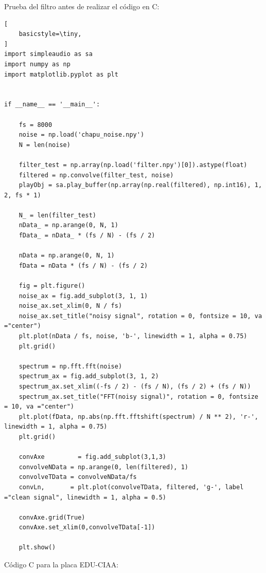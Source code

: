 \documentclass[
    11pt,
    spanish,
	a4paper
]{article}
\begin{document}
Prueba del filtro antes de realizar el código en C:


\begin{lstlisting}[
    basicstyle=\tiny,
]
import simpleaudio as sa
import numpy as np
import matplotlib.pyplot as plt


if __name__ == '__main__':

    fs = 8000
    noise = np.load('chapu_noise.npy')
    N = len(noise)

    filter_test = np.array(np.load('filter.npy')[0]).astype(float)
    filtered = np.convolve(filter_test, noise)
    playObj = sa.play_buffer(np.array(np.real(filtered), np.int16), 1, 2, fs * 1)

    N_ = len(filter_test)
    nData_ = np.arange(0, N, 1)
    fData_ = nData_ * (fs / N) - (fs / 2)

    nData = np.arange(0, N, 1)
    fData = nData * (fs / N) - (fs / 2)

    fig = plt.figure()
    noise_ax = fig.add_subplot(3, 1, 1)
    noise_ax.set_xlim(0, N / fs)
    noise_ax.set_title("noisy signal", rotation = 0, fontsize = 10, va ="center")
    plt.plot(nData / fs, noise, 'b-', linewidth = 1, alpha = 0.75)
    plt.grid()

    spectrum = np.fft.fft(noise)
    spectrum_ax = fig.add_subplot(3, 1, 2)
    spectrum_ax.set_xlim((-fs / 2) - (fs / N), (fs / 2) + (fs / N))
    spectrum_ax.set_title("FFT(noisy signal)", rotation = 0, fontsize = 10, va ="center")
    plt.plot(fData, np.abs(np.fft.fftshift(spectrum) / N ** 2), 'r-', linewidth = 1, alpha = 0.75)
    plt.grid()

    convAxe         = fig.add_subplot(3,1,3)
    convolveNData = np.arange(0, len(filtered), 1)
    convolveTData = convolveNData/fs
    convLn,       = plt.plot(convolveTData, filtered, 'g-', label ="clean signal", linewidth = 1, alpha = 0.5)

    convAxe.grid(True)
    convAxe.set_xlim(0,convolveTData[-1])

    plt.show()
\end{lstlisting}

Código C para la placa EDU-CIAA:
\end{document}
